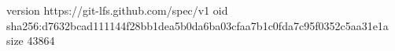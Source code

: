 version https://git-lfs.github.com/spec/v1
oid sha256:d7632bcad111144f28bb1dea5b0da6ba03cfaa7b1c0fda7c95f0352c5aa31e1a
size 43864
